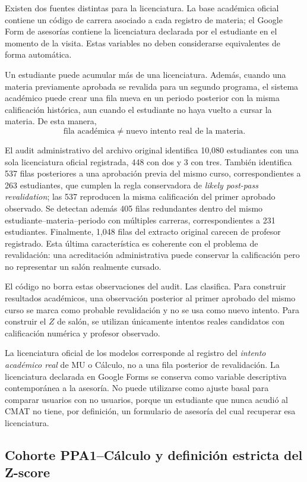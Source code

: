 Existen dos fuentes distintas para la licenciatura. La base académica oficial contiene un código de carrera asociado a cada registro de materia; el Google Form de asesorías contiene la licenciatura declarada por el estudiante en el momento de la visita. Estas variables no deben considerarse equivalentes de forma automática.

Un estudiante puede acumular más de una licenciatura. Además, cuando una materia previamente aprobada se revalida para un segundo programa, el sistema académico puede crear una fila nueva en un periodo posterior con la misma calificación histórica, aun cuando el estudiante no haya vuelto a cursar la materia. De esta manera,
\[
\boxed{\text{fila académica}\neq\text{nuevo intento real de la materia}.}
\]

El audit administrativo del archivo original identifica 10,080 estudiantes con una sola licenciatura oficial registrada, 448 con dos y 3 con tres. También identifica 537 filas posteriores a una aprobación previa del mismo curso, correspondientes a 263 estudiantes, que cumplen la regla conservadora de \emph{likely post-pass revalidation}; las 537 reproducen la misma calificación del primer aprobado observado. Se detectan además 405 filas redundantes dentro del mismo estudiante--materia--periodo con múltiples carreras, correspondientes a 231 estudiantes. Finalmente, 1,048 filas del extracto original carecen de profesor registrado. Esta última característica es coherente con el problema de revalidación: una acreditación administrativa puede conservar la calificación pero no representar un salón realmente cursado.

El código no borra estas observaciones del audit. Las clasifica. Para construir resultados académicos, una observación posterior al primer aprobado del mismo curso se marca como probable revalidación y no se usa como nuevo intento. Para construir el $Z$ de salón, se utilizan únicamente intentos reales candidatos con calificación numérica y profesor observado.

La licenciatura oficial de los modelos corresponde al registro del \emph{intento académico real} de MU o Cálculo, no a una fila posterior de revalidación. La licenciatura declarada en Google Forms se conserva como variable descriptiva contemporánea a la asesoría. No puede utilizarse como ajuste basal para comparar usuarios con no usuarios, porque un estudiante que nunca acudió al CMAT no tiene, por definición, un formulario de asesoría del cual recuperar esa licenciatura.

\subsection{Cohorte PPA1--Cálculo y definición estricta del Z-score}

